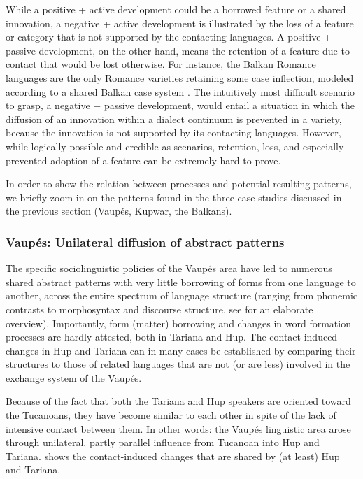 \documentclass[output=paper]{langscibook}
\begin{document}
\noindent While a positive + active development could be a borrowed feature or a shared innovation, a negative + active development is illustrated by the loss of a feature or category that is not supported by the contacting languages. A positive + passive development, on the other hand, means the retention of a feature due to contact that would be lost otherwise. For instance, the Balkan Romance languages are the only Romance varieties retaining some case inflection, modeled according to a shared Balkan case system \parencite[107]{wahlström2015}. The intuitively most difficult scenario to grasp, a negative + passive development, would entail a situation in which the diffusion of an innovation within a dialect continuum is prevented in a variety, because the innovation is not supported by its contacting languages. However, while logically possible and credible as scenarios, retention, loss, and especially prevented adoption of a feature can be extremely hard to prove.

In order to show the relation between processes and potential resulting patterns, we briefly zoom in on the patterns found in the three case studies discussed in the previous section (Vaupés, Kupwar, the Balkans).

\subsubsection{Vaupés: Unilateral diffusion of abstract patterns}

The specific sociolinguistic policies of the Vaupés area have led to numerous shared abstract patterns with very little borrowing of forms from one language to another, across the entire spectrum of language structure (ranging from phonemic contrasts to morphosyntax and discourse structure, see \textcite{Aikhenvald2002Language} for an elaborate overview). Importantly, form (matter) borrowing and changes in word formation processes are hardly attested, both in Tariana and Hup. The contact-induced changes in Hup and Tariana can in many cases be established by comparing their structures to those of related languages that are not (or are less) involved in the exchange system of the Vaupés.

Because of the fact that both the Tariana and Hup speakers are oriented toward the Tucanoans, they have become similar to each other in spite of the lack of intensive contact between them. In other words: the Vaupés linguistic area arose through unilateral, partly parallel influence from Tucanoan into Hup and Tariana.  shows the contact-induced changes that are shared by (at least) Hup and Tariana.
\end{document}
